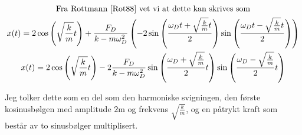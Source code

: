 \documentclass[11pt, A4paper,norsk]{article}
\begin{document}
			\begin{gather*}
\text{Fra Rottmann \cite{Rot88} vet vi at dette kan skrives som} \\
x(t) = 2 \cos\left( \sqrt{\frac{k}{m}} t \right) + \frac{F_D}{k - m \omega_D^2} \left( - 2 \sin\left( \frac{\omega_D t + \sqrt{\frac{k}{m}} t}{2} \right) \sin\left( \frac{\omega_D t - \sqrt{\frac{k}{m}} t}{2} \right) \right) \\
x(t) = 2 \cos\left( \sqrt{\frac{k}{m}} t \right) - 2 \frac{F_D}{k - m \omega_D^2} \sin\left( \frac{\omega_D + \sqrt{\frac{k}{m}}}{2} t \right) \sin\left( \frac{\omega_D - \sqrt{\frac{k}{m}}}{2} t \right)
			\end{gather*}
			\begin{flushleft}
Jeg tolker dette som en del som den harmoniske svigningen, den første kosinusbølgen med amplitude $2 \text{m}$ og frekvens $\sqrt{\frac{k}{m}}$, og en påtrykt kraft som består av to sinusbølger multiplisert.
			\end{flushleft}			
\end{document}
